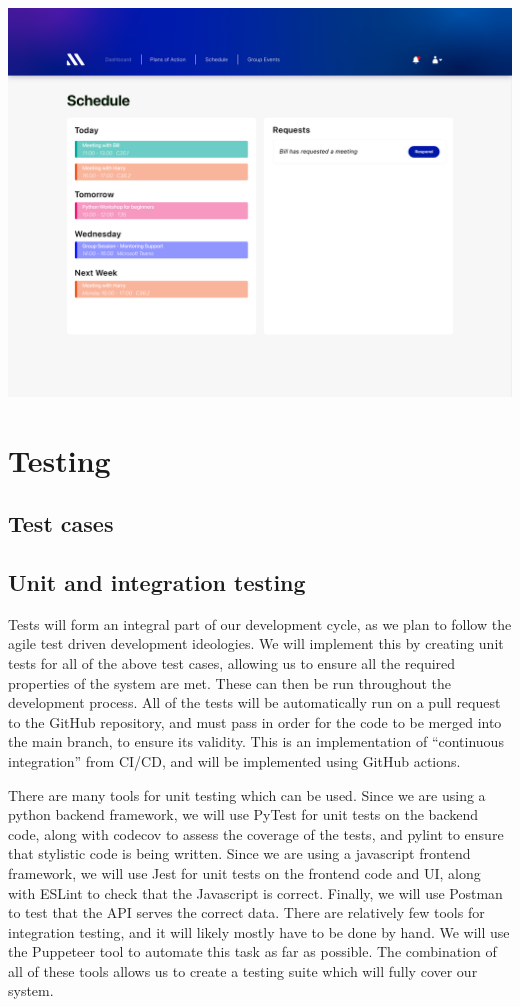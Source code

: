 \documentclass[10pt]{article}
\begin{document}
\includegraphics[scale=0.3]{Schedule}

\section{Testing}
\subsection{Test cases}
\subsection{Unit and integration testing}
Tests will form an integral part of our development cycle, as we plan to follow
the agile test driven development ideologies. We will implement this by creating
unit tests for all of the above test cases, allowing us to ensure all the
required properties of the system are met. These can then be run throughout the
development process. All of the tests will be automatically run on a pull
request to the GitHub repository, and must pass in order for the code to be
merged into the main branch, to ensure its validity. This is an implementation
of “continuous integration” from CI/CD, and will be implemented using GitHub
actions.

There are many tools for unit testing which can be used. Since we are using a
python backend framework, we will use PyTest for unit tests on the backend code,
along with codecov to assess the coverage of the tests, and pylint to ensure
that stylistic code is being written. Since we are using a javascript frontend
framework, we will use Jest for unit tests on the frontend code and UI, along
with ESLint to check that the Javascript is correct. Finally, we will use
Postman to test that the API serves the correct data. There are relatively few
tools for integration testing, and it will likely mostly have to be done by
hand. We will use the Puppeteer tool to automate this task as far as possible.
The combination of all of these tools allows us to create a testing suite which
will fully cover our system.




\end{document}
